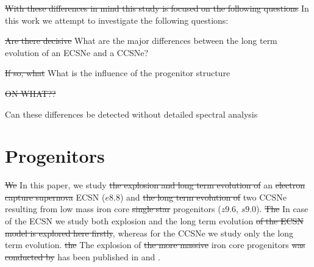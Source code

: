 \documentclass[fleqn,usenatbib]{mnras}
\newcommand{\NY}[2]{{\color{blue}\sout{#1}#2}}
\begin{document}
\NY{With these differences in mind this study is focused on the following questions}{ In this work we attempt to investigate the following questions:}
\begin{itemize}
\item \NY{Are there decisive}{ What are the major} differences between the long term evolution of \NY{}{an} ECSNe and \NY{}{a} CCSNe\NY{}{?}
\item \NY{If so, what}{ What} is the influence of the progenitor structure \NY{ON WHAT??} 
\item Can these differences be detected without detailed spectral analysis
\end {itemize}

\section{Progenitors}
\NY{We}{ In this paper, we} study \NY{the explosion and long term evolution of}{} an \NY{electron capture supernova}{ ECSN} ($e8.8$) and \NY{the long term evolution of}{} two \NY{}{CCSNe resulting from} low mass iron core \NY{single star}{} progenitors ($z9.6$, $s9.0$). \NY{The}{ In case of the ECSN we study both} explosion \NY{}{and the long term evolution} \NY{of the ECSN model is explored here firstly}{,} whereas \NY{}{for the CCSNe we study only the long term evolution.} \NY{the}{ The} explosion of \NY{the more massive}{ iron core} progenitors \NY{was conducted by}{ has been published in} \cite{Melson2015} and \cite{Melson2019}. 
\end{document}
